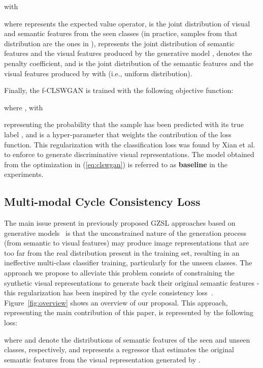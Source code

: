 \documentclass[runningheads]{llncs}
\begin{document}
with 



where  represents the expected value operator,  is the joint distribution of visual and semantic features from the seen classes (in practice, samples from that distribution are the ones in ),  represents the joint distribution of semantic features and the visual features produced by the generative model ,  denotes the penalty coefficient, and  is the joint distribution of the semantic features and the visual features produced by  with  (i.e., uniform distribution). 

Finally, the f-CLSWGAN is trained with the following objective function:



where , with 



representing the probability that the sample  has been predicted with its true
label , and  is a hyper-parameter that weights the contribution of the loss function.  This regularization with the classification loss was found by Xian et al.~\cite{XianCVPR2018} to enforce  to generate discriminative visual representations.  The model obtained from the optimization in (\ref{eq:clswgan}) is referred to as \textbf{baseline} in the experiments.

\subsection{Multi-modal Cycle Consistency Loss}
\label{sec:cycle}

The main issue present in previously proposed GZSL approaches based on generative models~\cite{XianCVPR2018,long2017zero,bucher2017generating} is that the unconstrained nature of the generation process (from semantic to visual features) may produce image representations that are too far from the real distribution present in the training set, resulting in an ineffective multi-class classifier training, particularly for the unseen classes.  The approach we propose to alleviate this problem consists of constraining the synthetic visual representations to generate back their original semantic features - this regularization has been inspired by the cycle consistency loss~\cite{CycleGAN2017}.  Figure~\ref{fig:overview} shows an overview of our proposal.
This approach, representing the main contribution of this paper, is represented by the following loss:





where  and  denote the distributions of semantic features of the seen and unseen classes, respectively, and  represents a regressor that estimates the original semantic features from the visual representation generated by .
\end{document}
